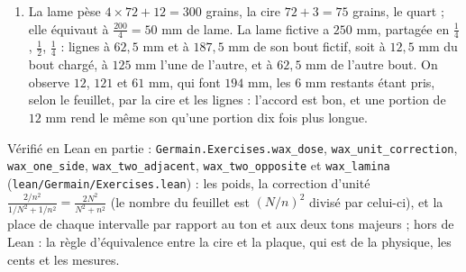\documentclass[11pt,a4paper]{article}
\begin{document}
\begin{solution}
\begin{enumerate}
  different pas sensiblement », ne vaut donc que pour le premier cas : $85$ cents
  séparent ici l'ancienne et la nouvelle. La lecture modernisée ajoute que
  l'équivalence d'une masse à une longueur n'est exacte qu'au premier ordre, pour de
  petites charges.
\item La lame pèse $4\times72 + 12 = 300$ grains, la cire $72 + 3 = 75$ grains, le
  quart ; elle équivaut à $\frac{200}{4} = 50$ mm de lame. La lame fictive a $250$ mm,
  partagée en $\frac14$, $\frac12$, $\frac14$ : lignes à $62{,}5$ mm et à $187{,}5$ mm de
  son bout fictif, soit à $12{,}5$ mm du bout chargé, à $125$ mm l'une de l'autre, et à
  $62{,}5$ mm de l'autre bout. On observe $12$, $121$ et $61$ mm, qui font $194$ mm, les
  $6$ mm restants étant pris, selon le feuillet, par la cire et les lignes : l'accord
  est bon, et une portion de $12$ mm rend le même son qu'une portion dix fois plus
  longue.
\end{enumerate}

Vérifié en Lean en partie : \texttt{Germain.Exercises.wax\_dose},
\texttt{wax\_unit\_correction}, \texttt{wax\_one\_side}, \texttt{wax\_two\_adjacent},
\texttt{wax\_two\_opposite} et \texttt{wax\_lamina} (\texttt{lean/Germain/Exercises.lean}) : les poids, la
correction d'unité $\frac{2/n^2}{1/N^2 + 1/n^2} = \frac{2N^2}{N^2+n^2}$ (le nombre du
feuillet est $(N/n)^2$ divisé par celui-ci), et la place de chaque intervalle par
rapport au ton et aux deux tons majeurs ; hors de Lean : la règle d'équivalence entre
la cire et la plaque, qui est de la physique, les cents et les mesures.
\end{solution}
\end{document}
